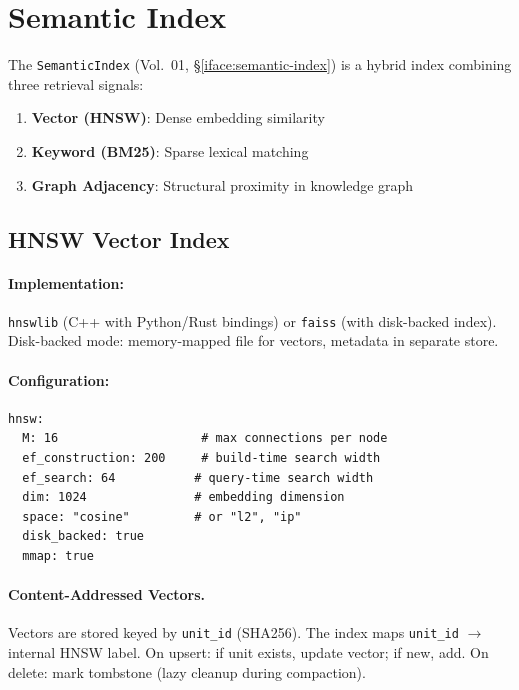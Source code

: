 \section{Semantic Index}
\label{sec:kg:index}

The \texttt{SemanticIndex} (Vol.~01, \S\ref{iface:semantic-index}) is a hybrid index combining three retrieval signals:

\begin{enumerate}
  \item \textbf{Vector (HNSW)}: Dense embedding similarity
  \item \textbf{Keyword (BM25)}: Sparse lexical matching
  \item \textbf{Graph Adjacency}: Structural proximity in knowledge graph
\end{enumerate}

\subsection{HNSW Vector Index}
\label{sec:kg:hnsw}

\paragraph{Implementation:} \texttt{hnswlib} (C++ with Python/Rust bindings) or \texttt{faiss} (with disk-backed index). Disk-backed mode: memory-mapped file for vectors, metadata in separate store.

\paragraph{Configuration:}
\begin{verbatim}
hnsw:
  M: 16                    # max connections per node
  ef_construction: 200     # build-time search width
  ef_search: 64           # query-time search width
  dim: 1024               # embedding dimension
  space: "cosine"         # or "l2", "ip"
  disk_backed: true
  mmap: true
\end{verbatim}

\paragraph{Content-Addressed Vectors.}
Vectors are stored keyed by \texttt{unit\_id} (SHA256). The index maps \texttt{unit\_id} $\to$ internal HNSW label. On upsert: if unit exists, update vector; if new, add. On delete: mark tombstone (lazy cleanup during compaction).

